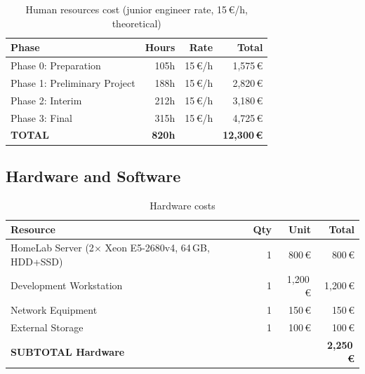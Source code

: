 \begin{table}[H]
    \centering
    \begin{tabularx}{\textwidth}{Xrrr}
\toprule
    \textbf{Phase} & \textbf{Hours} & \textbf{Rate} & \textbf{Total} \\
\midrule
    Phase 0: Preparation   & 105h & 15\,\euro/h & 1{,}575\,\euro \\
    Phase 1: Preliminary Project & 188h & 15\,\euro/h & 2{,}820\,\euro \\
    Phase 2: Interim       & 212h & 15\,\euro/h & 3{,}180\,\euro \\
    Phase 3: Final         & 315h & 15\,\euro/h & 4{,}725\,\euro \\
    \textbf{TOTAL}         & \textbf{820h} & & \textbf{12{,}300\,\euro} \\
\bottomrule
    \end{tabularx}
    \caption{Human resources cost (junior engineer rate, 15\,\euro/h, theoretical)}
    \label{tab:human_resources_cost}
\end{table}

\subsection{Hardware and Software}

\begin{table}[H]
    \centering
    \begin{tabularx}{\textwidth}{Xrrr}
\toprule
    \textbf{Resource} & \textbf{Qty} & \textbf{Unit} & \textbf{Total} \\
\midrule
    HomeLab Server (2$\times$ Xeon E5-2680v4, 64\,GB, HDD+SSD) & 1 & 800\,\euro & 800\,\euro \\
    Development Workstation & 1 & 1{,}200\,\euro & 1{,}200\,\euro \\
    Network Equipment & 1 & 150\,\euro & 150\,\euro \\
    External Storage & 1 & 100\,\euro & 100\,\euro \\
    \textbf{SUBTOTAL Hardware} & & & \textbf{2{,}250\,\euro} \\
\bottomrule
    \end{tabularx}
    \caption{Hardware costs}
    \label{tab:hardware_costs}
\end{table}

